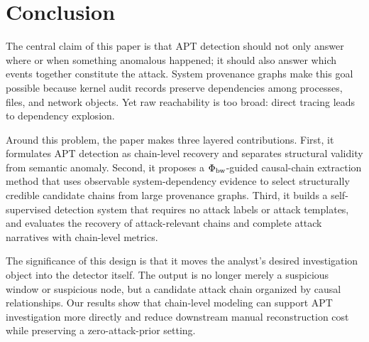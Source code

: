 \section{Conclusion}
\label{sec:conclusion}

The central claim of this paper is that APT detection should not only answer where or when something anomalous happened; it should also answer which events together constitute the attack. System provenance graphs make this goal possible because kernel audit records preserve dependencies among processes, files, and network objects. Yet raw reachability is too broad: direct tracing leads to dependency explosion.

Around this problem, the paper makes three layered contributions. First, it formulates APT detection as chain-level recovery and separates structural validity from semantic anomaly. Second, it proposes a $\Phi_{\text{bw}}$-guided causal-chain extraction method that uses observable system-dependency evidence to select structurally credible candidate chains from large provenance graphs. Third, it builds a self-supervised detection system that requires no attack labels or attack templates, and evaluates the recovery of attack-relevant chains and complete attack narratives with chain-level metrics.

The significance of this design is that it moves the analyst's desired investigation object into the detector itself. The output is no longer merely a suspicious window or suspicious node, but a candidate attack chain organized by causal relationships. Our results show that chain-level modeling can support APT investigation more directly and reduce downstream manual reconstruction cost while preserving a zero-attack-prior setting.
